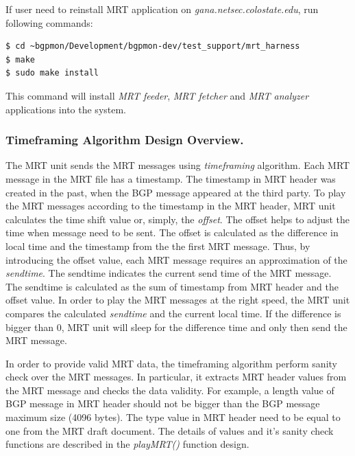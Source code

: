 If user need to reinstall MRT application on \emph{gana.netsec.colostate.edu}, run following commands:

\begin{verbatim}
$ cd ~bgpmon/Development/bgpmon-dev/test_support/mrt_harness
$ make 
$ sudo make install
\end{verbatim}

This command will install \emph{MRT feeder}, \emph{MRT fetcher} and \emph{MRT analyzer} applications into the system. 


\subsubsection{Timeframing Algorithm Design Overview.}
\label{sec:timeframing}


The MRT unit sends the MRT messages using \emph{timeframing} algorithm. Each MRT message in the MRT file has a timestamp. The timestamp in MRT header was created in the past, when the BGP message appeared at the third party.   To play the MRT messages according to the timestamp in the MRT header,  MRT unit calculates the  time shift value or,  simply, the \emph{offset}. The offset helps to adjust the time when message need to be sent. The offset is calculated as the difference in local time and the timestamp from the the first MRT message. Thus, by introducing the offset value, each MRT message requires an approximation of the \emph{sendtime}.  The sendtime indicates  the current send time of the MRT message. The sendtime is calculated as the sum of  timestamp from MRT header and the offset value.   In order to play the MRT messages at the right speed, the MRT unit compares the calculated \emph{sendtime} and the current local time. If the difference is bigger than 0, MRT unit will sleep for the difference time and only then send the MRT message.

In order to provide valid MRT data, the timeframing algorithm perform sanity check over the MRT messages. In particular, it extracts MRT header values from the MRT message and checks the data validity.  For example, a length value of BGP message in MRT header should not be bigger than the BGP message maximum size (4096 bytes). The type value in MRT header need to be equal to one from the MRT draft document.   The details of values and it's sanity check functions   are  described in the \emph{playMRT()} function design. 

